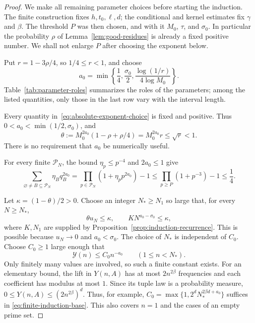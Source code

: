 \begin{proof}
We make all remaining parameter choices before starting the induction.
The finite construction fixes $h,t_0,\ell,d$; the conditional and kernel estimates
fix $\gamma$ and $\beta$.  The threshold $P$ was then chosen, and with it
$M_0$, $\tau$, and $\sigma_0$.  In particular the probability $\rho$ of
Lemma~\ref{lem:good-residues} is already a fixed positive number.  We shall
not enlarge $P$ after choosing the exponent below.

Put $r=1-3\rho/4$, so $1/4\le r<1$, and choose
\begin{equation}
 a_0=\min\left\{\frac14,\frac{\sigma_0}{2},
                  \frac{\log(1/r)}{4\log M_0}\right\}.
 \label{eq:absolute-exponent-choice}
\end{equation}
Table~\ref{tab:parameter-roles} summarizes the roles of the parameters;
among the listed quantities, only those in the last row vary with
the interval length.


Every quantity in~\eqref{eq:absolute-exponent-choice} is fixed and positive. Thus
$0<a_0<\min(1/2,\sigma_0)$, and
\begin{equation}
 \theta:=M_0^{2a_0}(1-\rho+\rho/4)
          =M_0^{2a_0}r\le\sqrt r<1.
 \label{eq:strict-induction-contraction}
\end{equation}
There is no requirement that $a_0$ be numerically useful.

For every finite $\mathcal P_N$, the bound $\eta_p\le p^{-4}$ and
$2a_0\le1$ give
\begin{equation}
 \sum_{\varnothing\ne B\subseteq\mathcal P_N}\eta_Bq_B^{2a_0}
 =\prod_{p\in\mathcal P_N}(1+\eta_p p^{2a_0})-1
 \le\prod_{p\ge P}(1+p^{-3})-1\le\frac14.
 \label{eq:induction-weighted-mass}
\end{equation}

Let $\kappa=(1-\theta)/2>0$.  Choose an integer $N_*\ge N_1$ so large that,
for every $N\ge N_*$,
\begin{equation}
 \theta u_N\le\kappa,\qquad
 K N^{a_0-\sigma_0}\le\kappa,
 \label{eq:induction-threshold-choice}
\end{equation}
where $K,N_1$ are supplied by
Proposition~\ref{prop:induction-recurrence}.  This is possible because
$u_N\to0$ and $a_0<\sigma_0$.  The choice of $N_*$ is independent of $C_0$.
Choose $C_0\ge1$ large enough that
\begin{equation}
 \mathcal Y(n)\le C_0 n^{-a_0}\qquad(1\le n<N_*).
 \label{eq:finite-induction-base}
\end{equation}
Only finitely many values are involved, so such a finite constant exists.
For an elementary bound, the lift in $Y(n,A)$ has at most $2n^{2\beta}$
frequencies and each coefficient has modulus at most $1$.  Since its tuple
law is a probability measure,
$0\le Y(n,A)\le(2n^{2\beta})^d$.  Thus, for example,
$C_0=\max\{1,2^dN_*^{2\beta d+a_0}\}$ suffices in
\eqref{eq:finite-induction-base}.  This also covers $n=1$ and the cases of
an empty prime set.


\end{proof}
